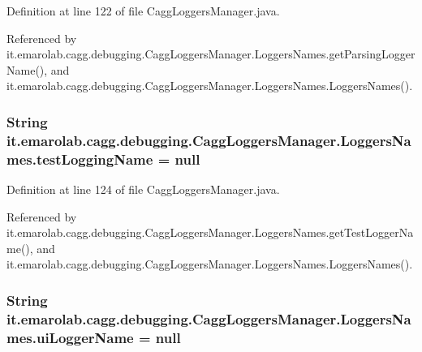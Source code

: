 Definition at line 122 of file Cagg\-Loggers\-Manager.\-java.



Referenced by it.\-emarolab.\-cagg.\-debugging.\-Cagg\-Loggers\-Manager.\-Loggers\-Names.\-get\-Parsing\-Logger\-Name(), and it.\-emarolab.\-cagg.\-debugging.\-Cagg\-Loggers\-Manager.\-Loggers\-Names.\-Loggers\-Names().

\hypertarget{classit_1_1emarolab_1_1cagg_1_1debugging_1_1CaggLoggersManager_1_1LoggersNames_a860f6b69ae378023ab41426c525ad092}{
\subsubsection[{test\-Logging\-Name}]{\setlength{\rightskip}{0pt plus 5cm}String it.\-emarolab.\-cagg.\-debugging.\-Cagg\-Loggers\-Manager.\-Loggers\-Names.\-test\-Logging\-Name = null\hspace{0.3cm}{\ttfamily [private]}}}\label{classit_1_1emarolab_1_1cagg_1_1debugging_1_1CaggLoggersManager_1_1LoggersNames_a860f6b69ae378023ab41426c525ad092}


Definition at line 124 of file Cagg\-Loggers\-Manager.\-java.



Referenced by it.\-emarolab.\-cagg.\-debugging.\-Cagg\-Loggers\-Manager.\-Loggers\-Names.\-get\-Test\-Logger\-Name(), and it.\-emarolab.\-cagg.\-debugging.\-Cagg\-Loggers\-Manager.\-Loggers\-Names.\-Loggers\-Names().

\hypertarget{classit_1_1emarolab_1_1cagg_1_1debugging_1_1CaggLoggersManager_1_1LoggersNames_aaccd04f4d8934067e7d10f9fa578300f}{
\subsubsection[{ui\-Logger\-Name}]{\setlength{\rightskip}{0pt plus 5cm}String it.\-emarolab.\-cagg.\-debugging.\-Cagg\-Loggers\-Manager.\-Loggers\-Names.\-ui\-Logger\-Name = null\hspace{0.3cm}{\ttfamily [private]}}}\label{classit_1_1emarolab_1_1cagg_1_1debugging_1_1CaggLoggersManager_1_1LoggersNames_aaccd04f4d8934067e7d10f9fa578300f}


